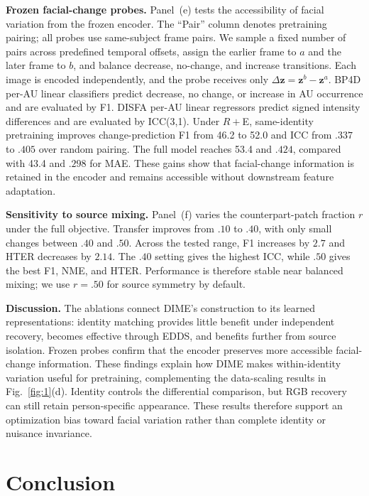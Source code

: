 \documentclass[10pt,journal,compsoc]{IEEEtran}
\begin{document}
\noindent\textbf{Frozen facial-change probes.}
Panel~(e) tests the accessibility of facial variation from the frozen encoder. The ``Pair'' column denotes pretraining pairing; all probes use same-subject frame pairs. We sample a fixed number of pairs across predefined temporal offsets, assign the earlier frame to $a$ and the later frame to $b$, and balance decrease, no-change, and increase transitions. Each image is encoded independently, and the probe receives only $\Delta\mathbf{z}=\mathbf{z}^{b}-\mathbf{z}^{a}$. BP4D per-AU linear classifiers predict decrease, no change, or increase in AU occurrence and are evaluated by F1. DISFA per-AU linear regressors predict signed intensity differences and are evaluated by ICC(3,1). Under $R+$E, same-identity pretraining improves change-prediction F1 from 46.2 to 52.0 and ICC from $.337$ to $.405$ over random pairing. The full model reaches 53.4 and $.424$, compared with 43.4 and $.298$ for MAE. These gains show that facial-change information is retained in the encoder and remains accessible without downstream feature adaptation.

\noindent\textbf{Sensitivity to source mixing.}
Panel~(f) varies the counterpart-patch fraction $r$ under the full objective. Transfer improves from $.10$ to $.40$, with only small changes between $.40$ and $.50$. Across the tested range, F1 increases by $2.7$ and HTER decreases by $2.14$. The $.40$ setting gives the highest ICC, while $.50$ gives the best F1, NME, and HTER. Performance is therefore stable near balanced mixing; we use $r=.50$ for source symmetry by default.

\noindent\textbf{Discussion.}
The ablations connect DIME's construction to its learned representations: identity matching provides little benefit under independent recovery, becomes effective through EDDS, and benefits further from source isolation. Frozen probes confirm that the encoder preserves more accessible facial-change information. These findings explain how DIME makes within-identity variation useful for pretraining, complementing the data-scaling results in Fig.~\ref{fig:1}(d). Identity controls the differential comparison, but RGB recovery can still retain person-specific appearance. These results therefore support an optimization bias toward facial variation rather than complete identity or nuisance invariance.

\section{Conclusion}
\end{document}
